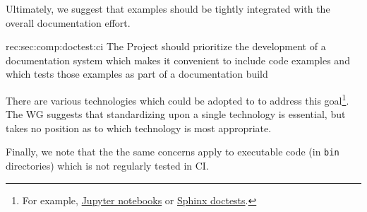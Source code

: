 Ultimately, we suggest that examples should be tightly integrated with the overall documentation effort.


\begin{recommendation}
    {rec:sec:comp:doctest:ci}
    {The Project should prioritize the development of a documentation system which makes it convenient to include code examples and which tests those examples as part of a documentation build}
\end{recommendation}

There are various technologies which could be adopted to to address this goal\footnote{For example, \href{https://jupyter.org/}{Jupyter notebooks} or \href{http://www.sphinx-doc.org/en/stable/ext/doctest.html}{Sphinx doctests}.}.
The WG suggests that standardizing upon a single technology is essential, but takes no position as to which technology is most appropriate.

Finally, we note that the the same concerns apply to executable code (in \texttt{bin} directories) which is not regularly tested in CI.
